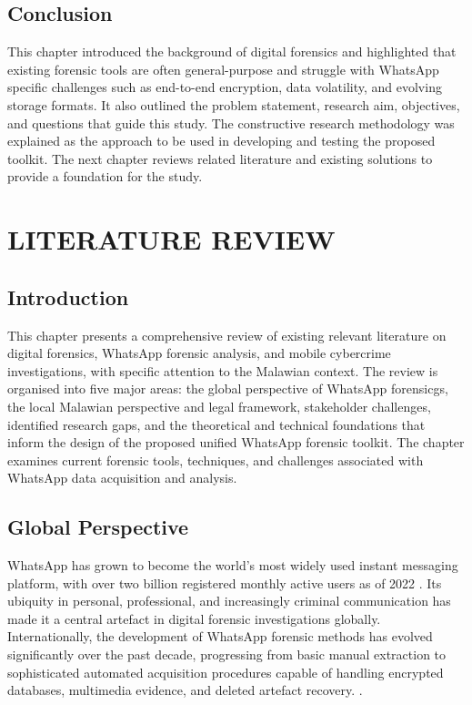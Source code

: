 \documentclass[12pt,a4paper]{report}
\begin{document}
\section{Conclusion}

This chapter introduced the background of digital forensics and highlighted that existing forensic tools are often general-purpose and struggle with WhatsApp specific challenges such as end-to-end encryption, data volatility, and evolving storage formats. It also outlined the problem statement, research aim, objectives, and questions that guide this study. The constructive research methodology was explained as the approach to be used in developing and testing the proposed toolkit. The next chapter reviews related literature and existing solutions to provide a foundation for the study.

\newpage
\chapter{LITERATURE REVIEW}

\section{Introduction}

This chapter presents a comprehensive review of existing relevant literature on digital forensics, WhatsApp forensic analysis, and mobile cybercrime investigations, with specific attention to the Malawian context. The review is organised into five major areas: the global perspective of WhatsApp forensicgs, the local Malawian perspective and legal framework, stakeholder challenges, identified research gaps, and the theoretical and technical foundations that inform the design of the proposed unified WhatsApp forensic toolkit. The chapter examines current forensic tools, techniques, and challenges associated with WhatsApp data acquisition and analysis.

\section{Global Perspective}

WhatsApp has grown to become the world's most widely used instant messaging platform, with over two billion registered monthly active users as of 2022 \citep{nishchal2024}. Its ubiquity in personal, professional, and increasingly criminal communication has made it a central artefact in digital forensic investigations globally. Internationally, the development of WhatsApp forensic methods has evolved significantly over the past decade, progressing from basic manual extraction to sophisticated automated acquisition procedures capable of handling encrypted databases, multimedia evidence, and deleted artefact recovery. 
\citep{anglano2014, prabowo2025}.
\end{document}
